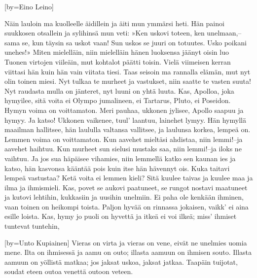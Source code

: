 \endsong




[by={Eino Leino}]

\beginverse
Näin lauloin ma kuolleelle äidillein
ja äiti mun ymmärsi heti.
Hän painoi suukkosen otsallein
ja sylihinsä mun veti:
»Ken uskovi toteen, ken unelmaan,--
sama se, kun täysin sa uskot vaan!
Sun uskos se juuri on totuutes.
Usko poikani unehes!»
\endverse
\beginverse
Miten mielelläin, niin mielelläin
hänen luoksensa jäänyt oisin
luo Tuonen virtojen viileäin,
mut kohtalot päätti toisin.
Vielä viimeisen kerran viittasi hän
kuin hän vain viitata tiesi.
Taas seisoin ma rannalla elämän,
mut nyt olin toinen miesi.
\endverse
\beginverse
Nyt tulkaa te murheet ja vastukset,
niin saatte te vasten suuta!
Nyt raudasta mulla on jänteret,
nyt luuni on yhtä luuta.
Kas, Apolloa, joka hymyilee,
sitä voita ei Olympo jumalineen,
ei Tartarus, Pluto, ei Poseidon.
Hymyn voima on voittamaton.
\endverse
\beginverse
Meri pauhaa, ukkonen jylisee,
Apollo saapuu ja hymyy.
Ja katso! Ukkonen vaikenee,
tuul' laantuu, lainehet lymyy.
Hän hymyllä maailman hallitsee,
hän laululla valtansa vallitsee,
ja laulunsa korkea, lempeä on.
Lemmen voima on voittamaton.
\endverse
\beginverse
Kun aavehet mieltäsi ahdistaa,
niin lemmi!--ja aavehet haihtuu.
Kun murheet sun sielusi mustaks saa,
niin lemmi!--ja iloks ne vaihtuu.
Ja jos sua häpäisee vihamies,
niin lemmellä katko sen kaunan ies
ja katso, hän kasvonsa kääntää pois
kuin itse hän hävennyt ois.
\endverse
\beginverse
Kuka taitavi lempeä vastustaa?
Ketä voita ei lemmen kieli?
Sitä kuulee taivas ja kuulee maa
ja ilma ja ihmismieli.
Kas, povet se aukovi paatuneet,
se rungot nostavi maatuneet
ja kutovi lehtihin, kukkasiin
ja uusihin unelmiin.
\endverse
\beginverse
Ei paha ole kenkään ihminen,
vaan toinen on heikompi toista.
Paljon hyvää on rinnassa jokaisen,
vaikk' ei aina esille loista.
Kas, hymy jo puoli on hyvettä
ja itkeä ei voi ilkeä;
miss' ihmiset tuntevat tuntehin,
\endverse

\endsong


[by={Unto Kupiainen}]
\beginverse
Vieras on virta ja vieras on vene, 
eivät ne unelmies uomia mene. 
Ilta on ihmisessä ja aamu on outo; 
illasta aamuun on ihmisen souto. 
Illasta aamuun on yöllistä matkaa; 
jos jaksat uskoa, jaksat jatkaa. 
Taapäin tuijotat, soudat eteen 
outoa venettä outoon veteen. 
\endverse
\endsong